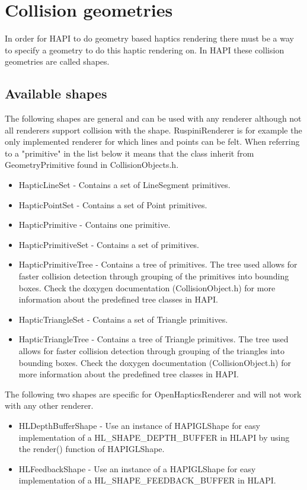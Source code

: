 \chapter{Collision geometries}
In order for HAPI to do geometry based haptics rendering there must be a way to
specify a geometry to do this haptic rendering on. In HAPI these collision
geometries are called shapes.

\section{Available shapes}
The following shapes are general and can be used with any renderer although
not all renderers support collision with the shape. RuspiniRenderer is for example the
only implemented renderer for which lines and points can be felt. When
referring to a "primitive" in the list below it means that the class inherit from
GeometryPrimitive found in CollisionObjects.h.

\begin{itemize}
\item HapticLineSet - Contains a set of LineSegment primitives.
\item HapticPointSet - Contains a set of Point primitives.
\item HapticPrimitive - Contains one primitive.
\item HapticPrimitiveSet - Contains a set of primitives.
\item HapticPrimitiveTree - Contains a tree of primitives. The tree used
allows for faster collision detection through grouping of the primitives
into bounding boxes. Check the doxygen documentation (CollisionObject.h)
for more information about the predefined tree classes in HAPI.
\item HapticTriangleSet - Contains a set of Triangle primitives.
\item HapticTriangleTree - Contains a tree of Triangle primitives. The tree used
allows for faster collision detection through grouping of the triangles
into bounding boxes. Check the doxygen documentation (CollisionObject.h)
for more information about the predefined tree classes in HAPI.
\end{itemize}

The following two shapes are specific for OpenHapticsRenderer and will not
work with any other renderer.
\begin{itemize}
\item HLDepthBufferShape - Use an instance of HAPIGLShape for easy
implementation of a HL\-\_SHAPE\-\_DEPTH\-\_BUFFER in HLAPI by using the render()
function of HAPIGLShape.
\item HLFeedbackShape - Use an instance of a HAPIGLShape for easy
implementation of a HL\-\_SHAPE\-\_FEEDBACK\-\_BUFFER in HLAPI.
\end{itemize}

